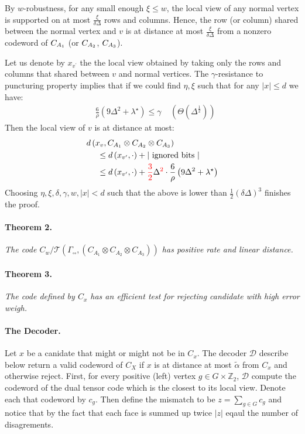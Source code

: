 \documentclass{article}
\begin{document}
\begin{multicols*}{2}
 By $w$-robustness, for any small enough $\xi \le w $, the local view of any normal vertex is supported on at most $\frac{\xi}{\delta\Delta}$ rows and columns. 
 Hence, the row (or column) shared between the normal vertex and $v$ is at distance at most $\frac{\xi}{\delta\Delta}$ from a nonzero codeword of $C_{A_{1}}$ (or $C_{A_{2}}$, $C_{A_{3}}$).


 Let us denote by $x_{v^{\prime}}$ the the local view obtained by taking only the rows and columns that shared between $v$ and normal vertices. The $\gamma$-resistance to puncturing property implies that if we could find $ \eta, \xi  $ such that for any $ |x| \le d $ we have:
 \begin{equation*}
   \begin{split}
     &  \frac{6}{\rho} \left( 9\Delta^{2} + \lambda^{\star}  \right) \le \gamma \ \ \ \ \ \left( \Theta\left(  \Delta^{\frac{1}{2}} \right) \right)
   \end{split}
 \end{equation*}
 Then the local view of $v$ is at distance at most:
 \begin{equation*}
   \begin{split}
     & d\left(x_{v}, C_{A_{1}} \otimes C_{A_{2}} \otimes C_{A_{3}}\right) \\ 
     & \ \ \ \ \le d\left(x_{v^{\prime} }, \cdot \right) + |\text{ ignored bits }|\\
     & \ \ \ \ \le  d\left(x_{v^{\prime}}, \cdot \right) +  \color{red}\frac{3}{2} \color{black} \Delta^{\color{red} 2 \color{black} } \cdot \frac{6}{\rho} \left( 9\Delta^{2} + \lambda^{\star}  \right) 
   \end{split}
 \end{equation*}
 Choosing $ \eta, \xi, \delta, \gamma, w, |x| < d $ such that the above is lower than $\frac{1}{2}\left( \delta\Delta \right)^{3}$ finishes the proof. 
 \paragraph{Theorem 2.} \textit{ The code $C_{w} / \mathcal{T}\left( \Gamma_{\square \square}, \left(  C_{A_1} \otimes C_{A_2} \otimes C_{A_3} \right)  \right)  $ has positive rate and linear distance.}
 \paragraph{Theorem 3.} \textit{ The code defined by $C_{x}$ has an efficient test for rejecting candidate with high error weigh. } 
 \paragraph{The Decoder.} Let $x$ be a canidate that might or might not be in $C_{x}$. The decoder $\mathcal{D}$ describe below return a valid codeword of $C_{X}$ if $x$ is at distance at most $\tilde{\alpha}$ from $C_{x}$ and otherwise reject.
 First, for every positive (left) vertex $g\in G\times \mathbb{Z}_2 $,  $\mathcal{D}$ compute the codeword of the dual tensor code which is the closest to its local view. Denote each that codeword by $c_g$. 
 Then define the mismatch to be $z = \sum_{g \in G}{c_g} $ and notice that by the fact that each face is summed up twice $|z|$ eqaul the number of disagrements. 
 

\end{multicols*}
\end{document}
